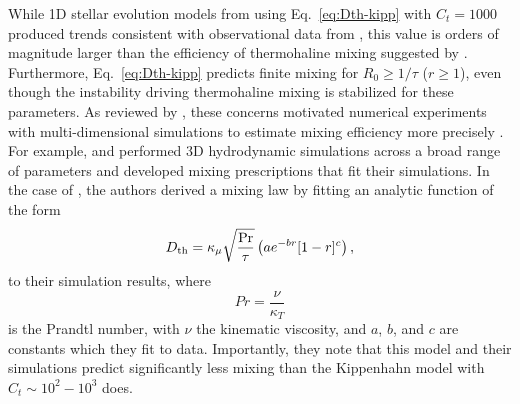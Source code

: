 While 1D stellar evolution models from \citet{charbonnel_thermohaline_2007} using Eq.~\eqref{eq:Dth-kipp} with $C_t = 1000$ produced trends consistent with observational data from \citet{Gratton2000}, this value is orders of magnitude larger than the efficiency of thermohaline mixing suggested by \citet{kippenhahn_etal_1980}. 
Furthermore, Eq.~\eqref{eq:Dth-kipp} predicts finite mixing for $R_0 \geq 1/\tau$ ($r \geq 1$), even though the instability driving thermohaline mixing is stabilized for these parameters. 
As reviewed by \citet{garaud_DDC_review_2018}, these concerns motivated numerical experiments with multi-dimensional simulations to estimate mixing efficiency more precisely \citep{Denissenkov2010thermohaline,traxler_etal_2011}. 
For example, \citet{traxler_etal_2011} and \citet{brown_etal_2013} performed 3D hydrodynamic simulations across a broad range of parameters and developed mixing prescriptions that fit their simulations. 
In the case of \citet{traxler_etal_2011}, the authors derived a mixing law by fitting an
analytic function 
of the form
\begin{equation} \label{eqn:trax_model}
   \Dth = \kappa_{\mu}\sqrt{\frac{\mathrm{Pr}}{\tau}}\left(a e^{-br}[1 - r]^c\right),
\end{equation}
to their simulation results,
where 
\begin{equation} \label{eq:Prandtl}
    Pr = \frac{\nu}{\kappa_T}
\end{equation}
is the Prandtl number, with $\nu$ the kinematic viscosity,
%
and $a$, $b$, and $c$ are constants which they fit to data. 
Importantly, they note that this model and their simulations predict significantly less mixing than the Kippenhahn model with $C_t \sim 10^2 - 10^3$ does.


